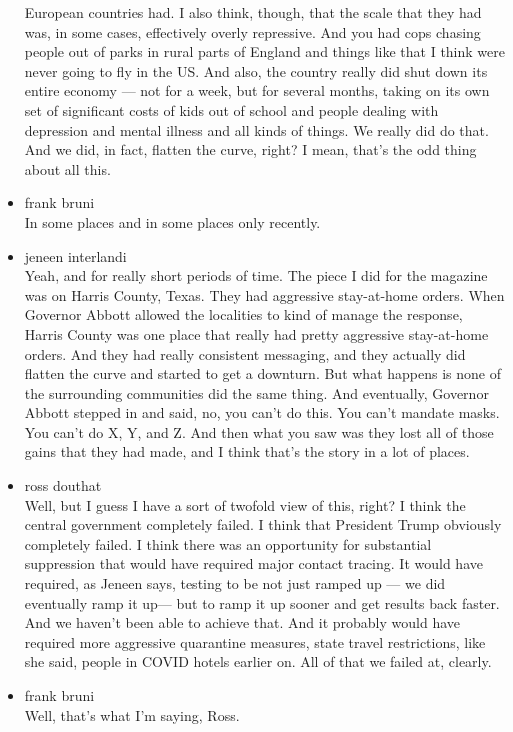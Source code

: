 \begin{itemize}
  European countries had. I also think, though, that the scale that they
  had was, in some cases, effectively overly repressive. And you had
  cops chasing people out of parks in rural parts of England and things
  like that I think were never going to fly in the US. And also, the
  country really did shut down its entire economy --- not for a week,
  but for several months, taking on its own set of significant costs of
  kids out of school and people dealing with depression and mental
  illness and all kinds of things. We really did do that. And we did, in
  fact, flatten the curve, right? I mean, that's the odd thing about all
  this.
\item
  frank bruni\\
  In some places and in some places only recently.
\item
  jeneen interlandi\\
  Yeah, and for really short periods of time. The piece I did for the
  magazine was on Harris County, Texas. They had aggressive stay-at-home
  orders. When Governor Abbott allowed the localities to kind of manage
  the response, Harris County was one place that really had pretty
  aggressive stay-at-home orders. And they had really consistent
  messaging, and they actually did flatten the curve and started to get
  a downturn. But what happens is none of the surrounding communities
  did the same thing. And eventually, Governor Abbott stepped in and
  said, no, you can't do this. You can't mandate masks. You can't do X,
  Y, and Z. And then what you saw was they lost all of those gains that
  they had made, and I think that's the story in a lot of places.
\item
  ross douthat\\
  Well, but I guess I have a sort of twofold view of this, right? I
  think the central government completely failed. I think that President
  Trump obviously completely failed. I think there was an opportunity
  for substantial suppression that would have required major contact
  tracing. It would have required, as Jeneen says, testing to be not
  just ramped up --- we did eventually ramp it up--- but to ramp it up
  sooner and get results back faster. And we haven't been able to
  achieve that. And it probably would have required more aggressive
  quarantine measures, state travel restrictions, like she said, people
  in COVID hotels earlier on. All of that we failed at, clearly.
\item
  frank bruni\\
  Well, that's what I'm saying, Ross.

\end{itemize}
